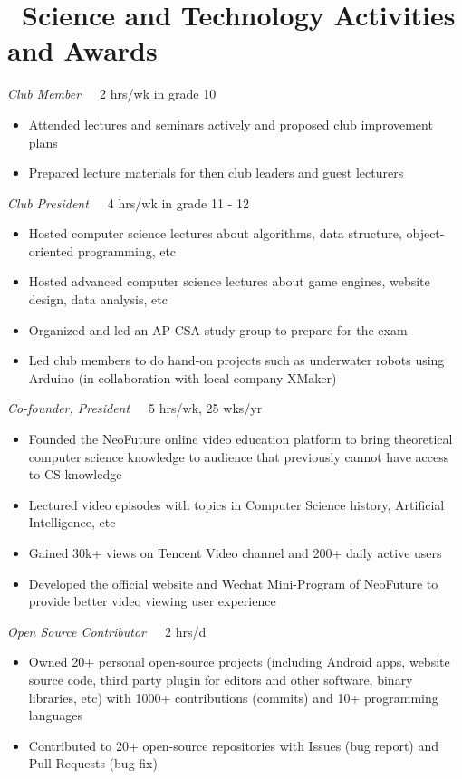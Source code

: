 \documentclass{resume}
\begin{document}
\section{\faCogs\ Science and Technology Activities and Awards}
\emph{Club Member}\ \ \ 2 hrs/wk in grade 10
\begin{itemize} 
  \item Attended lectures and seminars actively and proposed club improvement plans
  \item Prepared lecture materials for then club leaders and guest lecturers
\end{itemize}
\emph{Club President}\ \ \ 4 hrs/wk in grade 11 - 12
\begin{itemize}
  \item Hosted computer science lectures about algorithms, data structure, object-oriented programming, etc
  \item Hosted advanced computer science lectures about game engines, website design, data analysis, etc
  \item Organized and led an AP CSA study group to prepare for the exam
  \item Led club members to do hand-on projects such as underwater robots using Arduino (in collaboration with local company XMaker)
\end{itemize}

\emph{Co-founder, President}\ \ \ 5 hrs/wk, 25 wks/yr
\begin{itemize}
  \item Founded the NeoFuture online video education platform to bring theoretical computer science knowledge to audience that previously cannot have access to CS knowledge
  \item Lectured video episodes with topics in Computer Science history, Artificial Intelligence, etc
  \item Gained 30k+ views on Tencent Video channel and 200+ daily active users
  \item Developed the official website and Wechat Mini-Program  of NeoFuture to provide better video viewing user experience
\end{itemize}

\emph{Open Source Contributor}\ \ \ 2 hrs/d
\begin{itemize}
  \item Owned 20+ personal open-source projects (including Android apps, website source code, third party plugin for editors and other software, binary libraries, etc) with 1000+ contributions (commits) and 10+ programming languages
  \item Contributed to 20+ open-source repositories with Issues (bug report) and Pull Requests (bug fix)
\end{itemize}
\end{document}
